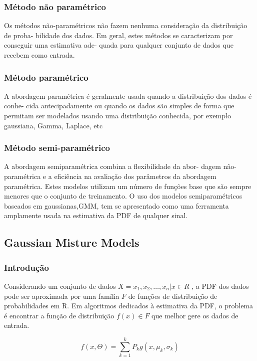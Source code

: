 \documentclass[ 
	article,			%
	11pt,				%
	oneside,			%
	a4paper,			%
	english,			%
	brazil,				%
	]{abntex2}
\begin{document}
\subsubsection{Método não paramétrico}
Os métodos não-paramétricos não fazem nenhuma consideração da distribuição de proba-
bilidade dos dados. Em geral, estes métodos se caracterizam por conseguir uma estimativa ade-
quada para qualquer conjunto de dados que recebem como entrada.


\subsubsection{Método paramétrico}
A abordagem paramétrica é geralmente usada quando a distribuição dos dados é conhe-
cida antecipadamente ou quando os dados são simples de forma que permitam ser modelados
usando uma distribuição conhecida, por exemplo gaussiana, Gamma, Laplace, etc

\subsubsection{Método semi-paramétrico}
A abordagem semiparamétrica  combina a flexibilidade da abor- dagem
não-paramétrica e a eficiência na avaliação dos parâmetros da abordagem
paramétrica. Estes modelos utilizam um número de funções base que são sempre
menores que o conjunto de treinamento. O uso dos modelos semiparamétricos
baseados em gaussianas,GMM, tem se apresentado como uma ferramenta amplamente
usada na estimativa da PDF de qualquer sinal.


\subsection{Gaussian Misture Models}

\subsubsection{Introdução}
Considerando um conjunto de dados $X={x_1,x_2,\ldots,x_n}| x \in R$ , a PDF dos
dados pode ser aproximada por uma família $F$ de funções de distribuição de
probabilidades em R. Em algoritmos dedicados à estimativa da PDF, o problema é
encontrar a função de distribuição $f(x) \in F$ que melhor gere os dados de
entrada.

\begin{equation}
f(x,\Theta)=\sum^{k}_{k=1}P_kg(x,\mu_k,\sigma_k)
\end{equation}
\end{document}

